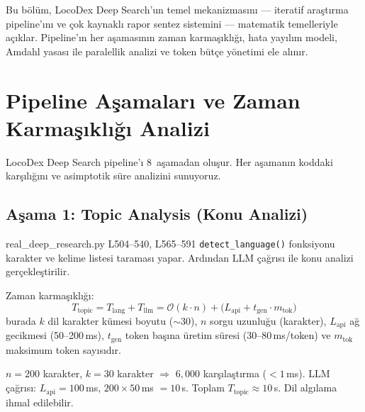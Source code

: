 
Bu b\"{o}l\"{u}m, LocoDex Deep Search'un temel mekanizmas{\i}n{\i} --- iteratif ara\c{s}t{\i}rma pipeline'{\i}n{\i} ve \c{c}ok kaynakl{\i} rapor sentez sistemini --- matematik temelleriyle a\c{c}{\i}klar. Pipeline'{\i}n her a\c{s}amas{\i}n{\i}n zaman karma\c{s}{\i}kl{\i}\u{g}{\i}, hata yay{\i}l{\i}m modeli, Amdahl yasas{\i} ile paralellik analizi ve token b\"{u}t\c{c}e y\"{o}netimi ele al{\i}n{\i}r.


\section{Pipeline A\c{s}amalar{\i} ve Zaman Karma\c{s}{\i}kl{\i}\u{g}{\i} Analizi}
\label{sec:pipeline_stages}

LocoDex Deep Search pipeline'{\i} 8~a\c{s}amadan olu\c{s}ur. Her a\c{s}aman{\i}n koddaki kar\c{s}{\i}l{\i}\u{g}{\i}n{\i} ve asimptotik s\"{u}re analizini sunuyoruz.

\subsection{A\c{s}ama 1: Topic Analysis (Konu Analizi)}

\begin{kodref}{real\_deep\_research.py L504--540, L565--591}
\texttt{detect\_language()} fonksiyonu karakter ve kelime listesi taramas{\i} yapar. Ard{\i}ndan LLM \c{c}a\u{g}r{\i}s{\i} ile konu analizi ger\c{c}ekle\c{s}tirilir.
\end{kodref}

Zaman karma\c{s}{\i}kl{\i}\u{g}{\i}:
\begin{equation}
\label{eq:topic_time}
T_{\text{topic}} = T_{\text{lang}} + T_{\text{llm}} = \mathcal{O}(k \cdot n) + \bigl(L_{\text{api}} + t_{\text{gen}} \cdot m_{\text{tok}}\bigr)
\end{equation}
burada $k$ dil karakter k\"{u}mesi boyutu ($\sim$30), $n$ sorgu uzunlu\u{g}u (karakter), $L_{\text{api}}$ a\u{g} gecikmesi (50--200\,ms), $t_{\text{gen}}$ token ba\c{s}{\i}na \"{u}retim s\"{u}resi (30--80\,ms/token) ve $m_{\text{tok}}$ maksimum token say{\i}s{\i}d{\i}r.

\begin{ornek}
$n = 200$ karakter, $k = 30$ karakter $\Rightarrow$ $6{,}000$ kar\c{s}{\i}la\c{s}t{\i}rma ($< 1$\,ms). LLM \c{c}a\u{g}r{\i}s{\i}: $L_{\text{api}} = 100$\,ms, $200 \times 50$\,ms $= 10$\,s. Toplam $T_{\text{topic}} \approx 10$\,s. Dil alg{\i}lama ihmal edilebilir.
\end{ornek}

